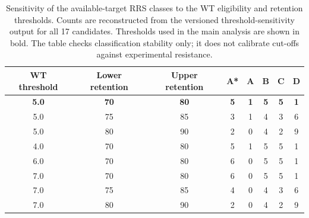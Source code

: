 \begin{table}[htbp]
\centering
\scriptsize
\caption{Sensitivity of the available-target RRS classes to the WT eligibility and retention thresholds. Counts are reconstructed from the versioned threshold-sensitivity output for all 17 candidates. Thresholds used in the main analysis are shown in bold. The table checks classification stability only; it does not calibrate cut-offs against experimental resistance.}
\label{tab:s11_rrs_threshold_sensitivity}
\begin{tabular}{cccccccc}
\toprule
WT threshold & Lower retention & Upper retention & A* & A & B & C & D \\
\midrule
\textbf{\num{5.0}} & \textbf{\num{70}} & \textbf{\num{80}} & \textbf{5} & \textbf{1} & \textbf{5} & \textbf{5} & \textbf{1} \\
\num{5.0} & \num{75} & \num{85} & 3 & 1 & 4 & 3 & 6 \\
\num{5.0} & \num{80} & \num{90} & 2 & 0 & 4 & 2 & 9 \\
\num{4.0} & \num{70} & \num{80} & 5 & 1 & 5 & 5 & 1 \\
\num{6.0} & \num{70} & \num{80} & 6 & 0 & 5 & 5 & 1 \\
\num{7.0} & \num{70} & \num{80} & 6 & 0 & 5 & 5 & 1 \\
\num{7.0} & \num{75} & \num{85} & 4 & 0 & 4 & 3 & 6 \\
\num{7.0} & \num{80} & \num{90} & 2 & 0 & 4 & 2 & 9 \\
\bottomrule
\end{tabular}
\end{table}
